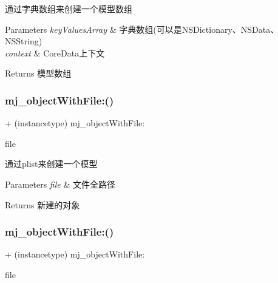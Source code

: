 通过字典数组来创建一个模型数组 
\begin{DoxyParams}{Parameters}
{\em key\+Values\+Array} & 字典数组(可以是\+N\+S\+Dictionary、\+N\+S\+Data、\+N\+S\+String) \\
\hline
{\em context} & Core\+Data上下文 \\
\hline
\end{DoxyParams}
\begin{DoxyReturn}{Returns}
模型数组 
\end{DoxyReturn}
\mbox{\label{category_n_s_object_07_m_j_key_value_08_a98ff8a880e1de766fe702c800c1ec70d}} 
\subsubsection{\texorpdfstring{mj\+\_\+object\+With\+File\+:()}{mj\_objectWithFile:()}\hspace{0.1cm}{\footnotesize\ttfamily [1/3]}}
{\footnotesize\ttfamily + (instancetype) mj\+\_\+object\+With\+File\+: \begin{DoxyParamCaption}\item[{(N\+S\+String $\ast$)}]{file }\end{DoxyParamCaption}}

通过plist来创建一个模型 
\begin{DoxyParams}{Parameters}
{\em file} & 文件全路径 \\
\hline
\end{DoxyParams}
\begin{DoxyReturn}{Returns}
新建的对象 
\end{DoxyReturn}
\mbox{\label{category_n_s_object_07_m_j_key_value_08_a98ff8a880e1de766fe702c800c1ec70d}} 
\subsubsection{\texorpdfstring{mj\+\_\+object\+With\+File\+:()}{mj\_objectWithFile:()}\hspace{0.1cm}{\footnotesize\ttfamily [2/3]}}
{\footnotesize\ttfamily + (instancetype) mj\+\_\+object\+With\+File\+: \begin{DoxyParamCaption}\item[{(N\+S\+String $\ast$)}]{file }\end{DoxyParamCaption}}

